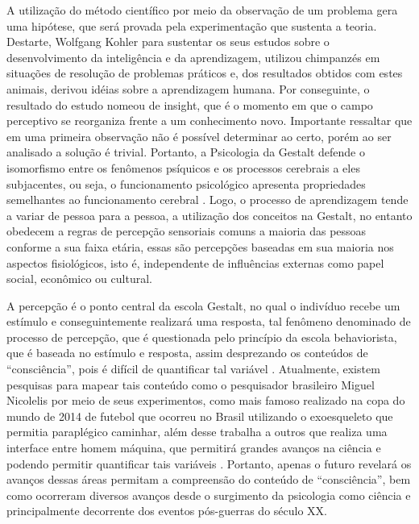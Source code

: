 A utilização do método científico por meio da observação de um problema gera uma hipótese, que será provada pela experimentação que sustenta a teoria. 
Destarte, Wolfgang Kohler para sustentar os seus estudos sobre o desenvolvimento da inteligência e da
aprendizagem, utilizou chimpanzés em situações de resolução de problemas práticos e, dos resultados obtidos com estes animais, derivou idéias sobre a aprendizagem humana. 
Por conseguinte, o resultado do estudo nomeou de insight, que é o momento em que o campo perceptivo se reorganiza frente a um conhecimento novo. 
Importante ressaltar que em uma primeira observação não é possível determinar ao certo, porém ao ser analisado a solução é trivial.
Portanto, a Psicologia da Gestalt defende o isomorfismo entre os fenômenos psíquicos e os
processos cerebrais a eles subjacentes, ou seja, o funcionamento psicológico apresenta propriedades semelhantes ao funcionamento cerebral \cite{silva2007psicologia_educacao}. 
Logo, o processo de aprendizagem tende a variar de pessoa para a pessoa, a utilização dos
conceitos na Gestalt, no entanto obedecem a regras de percepção sensoriais comuns a maioria das pessoas conforme a sua faixa etária, essas são percepções baseadas em sua maioria nos aspectos fisiológicos, isto é, independente de influências externas como papel social, econômico ou cultural.

A percepção é o ponto central da escola Gestalt, no qual o indivíduo recebe um estímulo e conseguintemente realizará uma resposta, tal fenômeno denominado de processo de percepção, que é questionada pelo princípio da escola behaviorista, que é baseada no estímulo e resposta, assim desprezando os conteúdos de ``consciência'', pois é difícil de quantificar tal variável \cite{bock1999psicologias}.
Atualmente, existem pesquisas para mapear tais conteúdo como o pesquisador brasileiro Miguel Nicolelis por meio de seus experimentos, como mais famoso realizado na copa do mundo de 2014 de futebol que ocorreu no Brasil utilizando o exoesqueleto que permitia paraplégico caminhar, além desse trabalha a outros que realiza uma interface entre homem máquina, que permitirá grandes avanços na ciência e podendo permitir quantificar tais variáveis \cite{nicolelis2015cerebro,nicolelis2020true}.
Portanto, apenas o futuro revelará os avanços dessas áreas permitam a compreensão do conteúdo de ``consciência'', bem como ocorreram diversos avanços desde o surgimento da psicologia como ciência e principalmente decorrente dos eventos pós-guerras do século XX.

